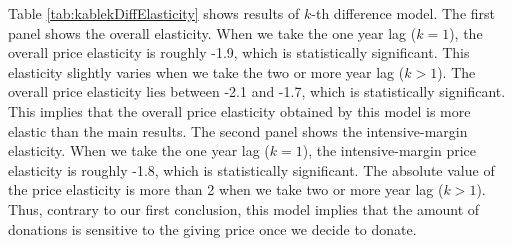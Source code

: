 \documentclass[ review  , 3p ]{elsarticle}
\begin{document}
  \color{black}

  Table \ref{tab:kablekDiffElasticity} shows results of \(k\)-th difference model.
  The first panel shows the overall elasticity.
  When we take the one year lag (\(k = 1\)), the overall price elasticity is roughly -1.9,
  which is statistically significant.
  This elasticity slightly varies when we take the two or more year lag (\(k > 1\)).
  The overall price elasticity lies between -2.1 and -1.7, which is statistically significant.
  This implies that the overall price elasticity obtained by this model is more elastic than the main results.
  The second panel shows the intensive-margin elasticity.
  When we take the one year lag (\(k = 1\)), the intensive-margin price elasticity is roughly -1.8,
  which is statistically significant.
  The absolute value of the price elasticity is more than 2
  when we take two or more year lag (\(k > 1\)).
  Thus, contrary to our first conclusion,
  this model implies that the amount of donations is sensitive to the giving price once we decide to donate.
\end{document}
